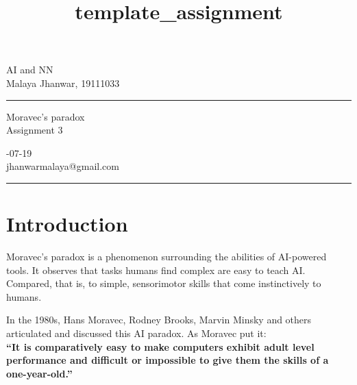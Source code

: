 \documentclass[a4paper,10pt]{article} %
\begin{document}


\title{template_assignment} %
\fancyhead[C]{}
\begin{minipage}{0.295\textwidth} %
\raggedright
AI and NN\\ %
\footnotesize %
Malaya Jhanwar, 19111033 %
\medskip\hrule
\end{minipage}
\begin{minipage}{0.4\textwidth} %
\centering 
\large %
Moravec's paradox\\ %
\normalsize %
Assignment 3\\ %
\end{minipage}
\begin{minipage}{0.295\textwidth} %
-07-19\\ %
\footnotesize %
jhanwarmalaya@gmail.com%
\medskip\hrule
\end{minipage}



\section{Introduction}

Moravec’s paradox is a phenomenon surrounding the abilities of AI-powered tools. It observes that tasks humans find complex are easy to teach AI. Compared, that is, to simple, sensorimotor skills that come instinctively to humans.

In the 1980s, Hans Moravec, Rodney Brooks, Marvin Minsky and others articulated and discussed this AI paradox. As Moravec put it:\\
\textbf{“It is comparatively easy to make computers exhibit adult level performance  and difficult or impossible to give them the skills of a one-year-old.”}
\end{document}
